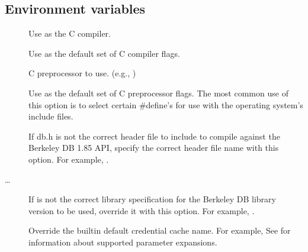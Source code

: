 \documentclass[letterpaper,10pt,english]{sphinxmanual}
\begin{document}
\subsection{Environment variables}
\label{\detokenize{build/options2configure:environment-variables}}\begin{description}
\item[{}] \leavevmode
\sphinxAtStartPar
Use  as the C compiler.

\item[{}] \leavevmode
\sphinxAtStartPar
Use  as the default set of C compiler flags.

\item[{}] \leavevmode
\sphinxAtStartPar
C preprocessor to use. (e.g., )

\item[{}] \leavevmode
\sphinxAtStartPar
Use  as the default set of C preprocessor flags.  The
most common use of this option is to select certain \#define’s for
use with the operating system’s include files.

\item[{}] \leavevmode
\sphinxAtStartPar
If db.h is not the correct header file to include to compile
against the Berkeley DB 1.85 API, specify the correct header file
name with this option. For example, .

\item[{…}] \leavevmode
\sphinxAtStartPar
If  is not the correct library specification for the
Berkeley DB library version to be used, override it with this
option. For example, .

\item[{}] \leavevmode
\sphinxAtStartPar
Override the built\sphinxhyphen{}in default credential cache name.
For example, 
See  for information about supported
parameter expansions.


\end{description}
\end{document}
